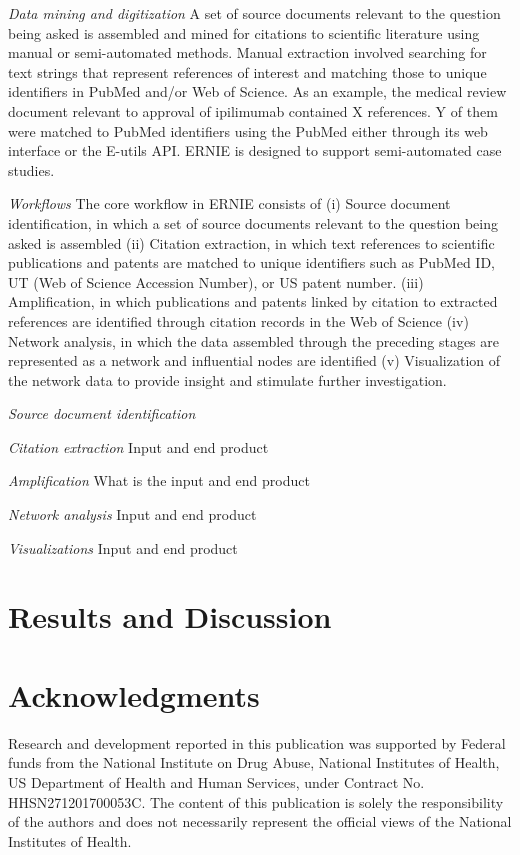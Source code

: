 \documentclass[review]{elsarticle}
\begin{document}
\emph{Data mining and digitization} A set of source documents relevant to the question being asked is assembled and mined for citations to scientific literature using manual or semi-automated methods. Manual extraction involved searching for text strings that represent references of interest and matching those to unique identifiers in PubMed and/or Web of Science. As an example, the medical review document relevant to approval of ipilimumab contained X references. Y of them were matched to PubMed identifiers using the PubMed either through its web interface or the E-utils API. ERNIE is designed to support semi-automated case studies.

\emph{Workflows} The core workflow in ERNIE consists of (i) Source document identification, in which a set of source documents relevant to the question being asked is assembled  (ii) Citation extraction, in which text references to scientific publications and patents are matched to unique identifiers such as PubMed ID, UT (Web of Science Accession Number), or US patent number.  (iii) Amplification, in which publications and patents linked by citation to extracted references are identified through citation records in the Web of Science (iv) Network analysis, in which the data assembled through the preceding stages are represented as a network and influential nodes are identified (v) Visualization of the network data to provide insight and stimulate further investigation.

\emph {Source document identification}

\emph {Citation extraction} Input and end product

\emph {Amplification} What is the input and end product

\emph{Network analysis} Input and end product

\emph{Visualizations} Input and end product

\section*{Results and Discussion}
\section*{Acknowledgments} Research and development reported in this publication was supported by Federal funds from the National Institute on Drug Abuse, National Institutes of Health, US Department of Health and Human Services, under Contract No. HHSN271201700053C. The content of this publication is solely the responsibility of the authors and does not necessarily represent the official views of the National Institutes of Health.
\end{document}
